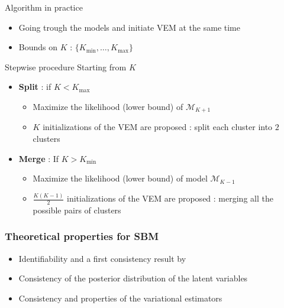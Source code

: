 \documentclass[compress,10pt]{beamer}
\begin{document}
\begin{frame}{Algorithm in practice}  
\begin{itemize}
\item Going trough the models and initiate VEM at the same time
\item Bounds on $K$ :  $\{K_{ \min},\dots, K_{\max}\}$
\end{itemize}

\begin{block}{Stepwise procedure}
Starting from  $K$

\begin{itemize}
\item \textbf{Split} : if $K<K_{\max}$
\begin{itemize}
\item Maximize the likelihood (lower bound) of  $\mathcal{M}_{K+1}$
\item  $K$ initializations of the VEM are proposed :  split each cluster into $2$ clusters  
\end{itemize}
\item \textbf{Merge} :  If $K>K_{\min}$
\begin{itemize}
\item Maximize the likelihood (lower bound) of   model  $\mathcal{M}_{K-1}$
\item  $\frac{K(K-1)}{2}$ initializations of the VEM are proposed :   merging all the possible pairs of  clusters 
 \end{itemize}
\end{itemize}

\end{block}
 \end{frame}


\begin{frame}\frametitle{Theoretical properties for SBM}
\begin{itemize}
\item Identifiability and a first consistency result by \color{blue} \cite{celisse2012consistency} \color{black}
\item Consistency of the posterior distribution of the latent variables \color{blue} \cite{mariadassou2015convergence} \color{black}
\item Consistency and properties of the variational estimators \color{blue} \cite{bickel2013asymptotic} \color{black}
\end{itemize}
\end{frame}
\end{document}
